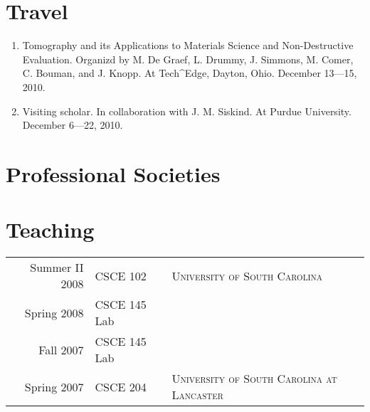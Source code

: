 \documentclass[a4paper,10pt]{article}
\begin{document}
\section{Travel}
\begin{enumerate}
\renewcommand{\labelenumi}{[T\arabic{enumi}] }
\item Tomography and its Applications to Materials Science and Non-Destructive Evaluation. Organizd by M. De Graef, L. Drummy, J. Simmons, M. Comer, C. Bouman, and J. Knopp. At Tech\^{}Edge, Dayton, Ohio. December 13---15, 2010.
\item Visiting scholar. In collaboration with J. M. Siskind. At Purdue University. December 6---22, 2010.
\end{enumerate}

\section{Professional Societies}

\section{Teaching}
\begin{tabular}{r|l|l }
Summer II 2008 & CSCE 102 & \textsc{University of South Carolina} \\
Spring 2008 & CSCE 145 Lab &  \\
Fall 2007 & CSCE 145 Lab & \\
Spring 2007 & CSCE 204 & \textsc{University of South Carolina at Lancaster}\\
\end{tabular}
\end{document}

